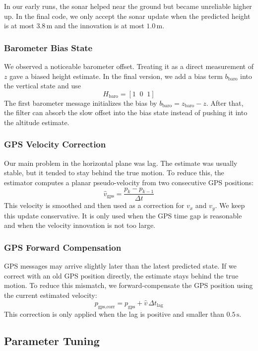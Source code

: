 \documentclass[12pt,twoside,letterpaper]{article}
\begin{document}
In our early runs, the sonar helped near the ground but became unreliable higher up. In the final code, we only accept the sonar update when the predicted height is at most $3.8\,\text{m}$ and the innovation is at most $1.0\,\text{m}$.

\subsubsection{Barometer Bias State}

We observed a noticeable barometer offset. Treating it as a direct measurement of $z$ gave a biased height estimate. In the final version, we add a bias term $b_{\text{baro}}$ into the vertical state and use
\[
    H_{\text{baro}} = [1 \;\; 0 \;\; 1]
\]
The first barometer message initializes the bias by $b_{\text{baro}} = z_{\text{baro}} - z$. After that, the filter can absorb the slow offset into the bias state instead of pushing it into the altitude estimate.

\subsubsection{GPS Velocity Correction}

Our main problem in the horizontal plane was lag. The estimate was usually stable, but it tended to stay behind the true motion. To reduce this, the estimator computes a planar pseudo-velocity from two consecutive GPS positions:
\[
    \hat{v}_{\text{gps}} = \frac{p_k - p_{k-1}}{\Delta t}
\]
This velocity is smoothed and then used as a correction for $v_x$ and $v_y$. We keep this update conservative. It is only used when the GPS time gap is reasonable and when the velocity innovation is not too large.

\subsubsection{GPS Forward Compensation}

GPS messages may arrive slightly later than the latest predicted state. If we correct with an old GPS position directly, the estimate stays behind the true motion. To reduce this mismatch, we forward-compensate the GPS position using the current estimated velocity:
\[
    p_{\text{gps,corr}} = p_{\text{gps}} + \hat{v}\,\Delta t_{\text{lag}}
\]
This correction is only applied when the lag is positive and smaller than $0.5\,\text{s}$.

\subsection{Parameter Tuning}
\end{document}
